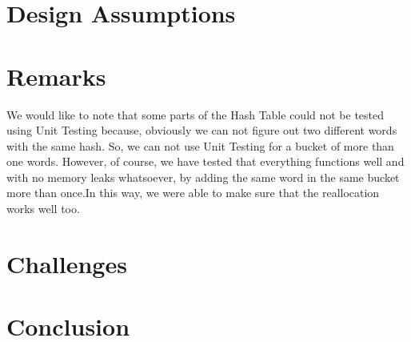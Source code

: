 \documentclass{article}
\begin{document}
\section{Design Assumptions}
\section{Remarks}
We would like to note that some parts of the Hash Table could not be tested using Unit Testing because, obviously we can not figure out two different words with the same hash. So, we can not use Unit Testing for a bucket of more than one words. However, of course, we have tested that everything functions well and with no memory leaks whatsoever, by adding the same word in the same bucket more than once.In this way, we were able to make sure that the reallocation works well too.
\section{Challenges}
\section{Conclusion}
\end{document}
